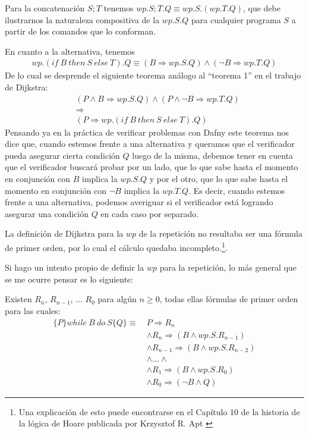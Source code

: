 \documentclass[12pt, a4paper, openany, fleqn]{book}
\begin{document}
    Para la concatenación $S;T$ tenemos $wp.S;T.Q \equiv wp.S.(wp.T.Q)$, que debe ilustrarnos la naturaleza compositiva de la $wp.S.Q$ para cualquier programa $S$ a partir de los comandos que lo conforman.

    En cuanto a la alternativa, tenemos
    \begin{align*}
        wp.(if\ B\ then\ S\ else\ T).Q \equiv (B \Rightarrow wp.S.Q) \land (\lnot B \Rightarrow wp.T.Q)
    \end{align*}
    De lo cual se desprende el siguiente teorema análogo al ``teorema 1'' en el trabajo de Dijkstra:
    \begin{align*}
        &(P \land B \Rightarrow wp.S.Q) \land (P \land \lnot B \Rightarrow wp.T.Q) \\
        &\Rightarrow \\
        &(P \Rightarrow wp.(if\ B\ then\ S\ else\ T).Q)
    \end{align*}
    Pensando ya en la práctica de verificar problemas con Dafny este teorema nos dice que, cuando estemos frente a una alternativa y queramos que el verificador pueda asegurar cierta condición $Q$ luego de la misma, debemos tener en cuenta que el verificador buscará probar por un lado, que lo que sabe hasta el momento en conjunción con $B$ implica la $wp.S.Q$ y por el otro, que lo que sabe hasta el momento en conjunción con $\lnot B$ implica la $wp.T.Q$. Es decir, cuando estemos frente a una alternativa, podemos averiguar si el verificador está logrando asegurar una condición $Q$ en cada caso por separado.

    La definición de Dijkstra para la $wp$ de la repetición no resultaba ser una fórmula de primer orden, por lo cual el cálculo quedaba incompleto.\footnote{Una explicación de esto puede encontrarse en el Capítulo 10 de la historia de la lógica de Hoare publicada por Krzysztof R. Apt \cite{10.1007/s00165-019-00501-3}}.

    Si hago un intento propio de definir la $wp$ para la repetición, lo más general que se me ocurre pensar es lo siguiente:

    Existen $R_n$, $R_{n-1}$, ... $R_0$ para algún $n \geqslant 0$, todas ellas fórmulas de primer orden para las cuales:
    \begin{align*}
    \{P\}while\ B\ do\ S\{Q\} \equiv \ & P \Rightarrow R_n \\
                                     & \land R_n \Rightarrow (B \land wp.S.R_{n-1}) \\
                                     & \land R_{n-1} \Rightarrow (B \land wp.S.R_{n-2}) \\
                                     & \land ... \land \\
                                     & \land R_1 \Rightarrow (B \land wp.S.R_0) \\
                                     & \land R_0 \Rightarrow (\lnot B \land Q)
    \end{align*}
\end{document}
